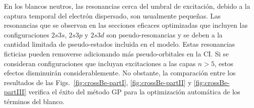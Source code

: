 En los blancos neutros, las resonancias cerca del umbral de excitación, 
debido a la captura temporal del electrón dispersado, son usualmente 
pequeñas. Las resonancias que se observan en las secciones eficaces 
optimizadas que incluyen las configuraciones $2s3s$, $2s3p$ y $2s3d$ son 
pseudo-resonancias y se deben a la cantidad limitada de pseudo-estados 
incluida en el modelo. Estas resonancias ficticias pueden removerse 
adicionando más pseudo-orbitales en la CI. Si se consideran 
configuraciones que incluyan excitaciones a las capas $n>5$, estos 
efectos disminuirán considerablemente.
No obstante, la comparación entre los resultados de las 
Figs.~\ref{fig:crossBe-partI}, \ref{fig:crossBe-partII} y 
\ref{fig:crossBe-partIII} verifica el éxito del método GP para la 
optimización automática de los términos del blanco. 



